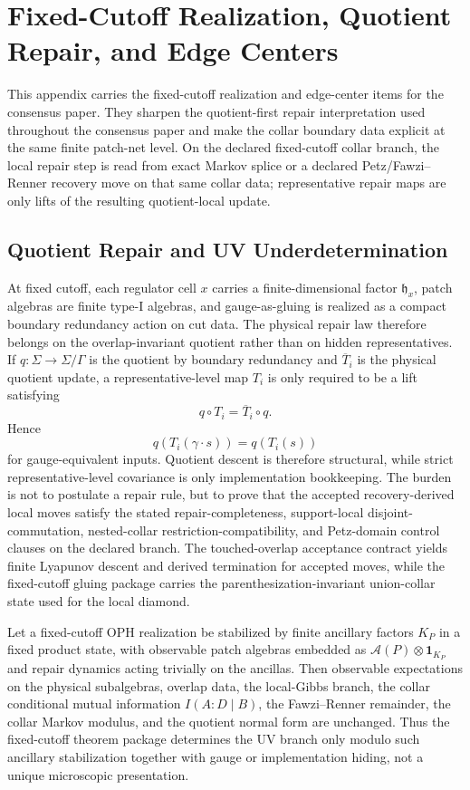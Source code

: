 \section{Fixed-Cutoff Realization, Quotient Repair, and Edge Centers}
\label{app:consensus-fixed-cutoff-port}

This appendix carries the fixed-cutoff realization and edge-center items for the consensus paper.
They sharpen the
quotient-first repair interpretation used throughout the consensus paper and make the collar
boundary data explicit at the same finite patch-net level. On the declared fixed-cutoff collar
branch, the local repair step is read from exact Markov splice or a declared Petz/Fawzi--Renner
recovery move on that same collar data; representative repair maps are only lifts of the resulting
quotient-local update.

\subsection{Quotient Repair and UV Underdetermination}

At fixed cutoff, each regulator cell \(x\) carries a finite-dimensional factor
\(\mathfrak h_x\), patch algebras are finite type-I algebras, and gauge-as-gluing is realized as
a compact boundary redundancy action on cut data. The physical repair law therefore belongs on the
overlap-invariant quotient rather than on hidden representatives. If \(q:\Sigma\to\Sigma/\Gamma\)
is the quotient by boundary redundancy and \(\overline T_i\) is the physical quotient update, a
representative-level map \(T_i\) is only required to be a lift satisfying
\[
q\circ T_i=\overline T_i\circ q.
\]
Hence
\[
q(T_i(\gamma\cdot s))=q(T_i(s))
\]
for gauge-equivalent inputs. Quotient descent is therefore structural, while strict
representative-level covariance is only implementation bookkeeping. The burden is not to
postulate a repair rule, but to prove that the accepted recovery-derived local moves satisfy the
stated repair-completeness, support-local disjoint-commutation, nested-collar
restriction-compatibility, and Petz-domain control clauses on the declared branch. The
touched-overlap acceptance contract yields finite Lyapunov descent and derived
termination for accepted moves, while the fixed-cutoff gluing package carries the
parenthesization-invariant union-collar state used for the local diamond.

\begin{proposition}
Let a fixed-cutoff OPH realization be stabilized by finite ancillary factors \(K_P\) in a fixed
product state, with observable patch algebras embedded as
\(\mathcal A(P)\otimes \mathbf 1_{K_P}\) and repair dynamics acting trivially on the ancillas.
Then observable expectations on the physical subalgebras, overlap data, the local-Gibbs branch,
the collar conditional mutual information \(I(A:D\mid B)\), the Fawzi--Renner remainder, the
collar Markov modulus, and the quotient normal form are unchanged. Thus the fixed-cutoff theorem
package determines the UV branch only modulo such ancillary stabilization together with gauge or
implementation hiding, not a unique microscopic presentation.
\end{proposition}

